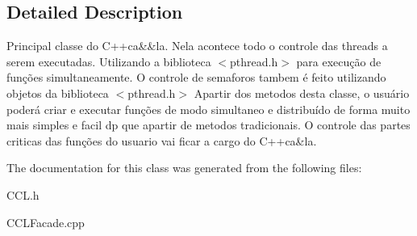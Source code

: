 \subsection{Detailed Description}
Principal classe do C++ca\&\&la. Nela acontece todo o controle das threads a serem executadas. Utilizando a biblioteca $<$pthread.\-h$>$ para execução de funções simultaneamente. O controle de semaforos tambem é feito utilizando objetos da biblioteca $<$pthread.\-h$>$ Apartir dos metodos desta classe, o usuário poderá criar e executar funções de modo simultaneo e distribuído de forma muito mais simples e facil dp que apartir de metodos tradicionais. O controle das partes criticas das funções do usuario vai ficar a cargo do C++ca\&la. 

The documentation for this class was generated from the following files\-:\begin{DoxyCompactItemize}
\item 
C\-C\-L.\-h\item 
C\-C\-L\-Facade.\-cpp\end{DoxyCompactItemize}
